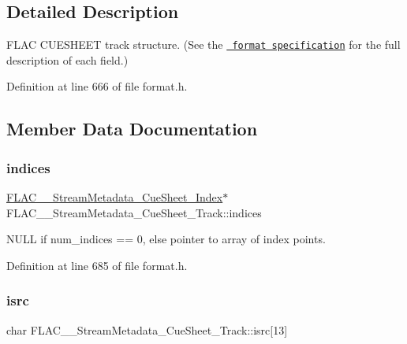 \subsection{Detailed Description}
F\+L\+AC C\+U\+E\+S\+H\+E\+ET track structure. (See the \href{../format.html\#cuesheet_track}{\texttt{ format specification}} for the full description of each field.) 

Definition at line 666 of file format.\+h.



\subsection{Member Data Documentation}
\mbox{\label{struct_f_l_a_c_____stream_metadata___cue_sheet___track_a14e0692a77b5b6689e208f48369edb90}} 
\subsubsection{\texorpdfstring{indices}{indices}}
{\footnotesize\ttfamily \mbox{\hyperlink{struct_f_l_a_c_____stream_metadata___cue_sheet___index}{F\+L\+A\+C\+\_\+\+\_\+\+Stream\+Metadata\+\_\+\+Cue\+Sheet\+\_\+\+Index}}$\ast$ F\+L\+A\+C\+\_\+\+\_\+\+Stream\+Metadata\+\_\+\+Cue\+Sheet\+\_\+\+Track\+::indices}

N\+U\+LL if num\+\_\+indices == 0, else pointer to array of index points. 

Definition at line 685 of file format.\+h.

\mbox{\label{struct_f_l_a_c_____stream_metadata___cue_sheet___track_a4990c8b13969f4c62683d915ebbf5744}} 
\subsubsection{\texorpdfstring{isrc}{isrc}}
{\footnotesize\ttfamily char F\+L\+A\+C\+\_\+\+\_\+\+Stream\+Metadata\+\_\+\+Cue\+Sheet\+\_\+\+Track\+::isrc\mbox{[}13\mbox{]}}

